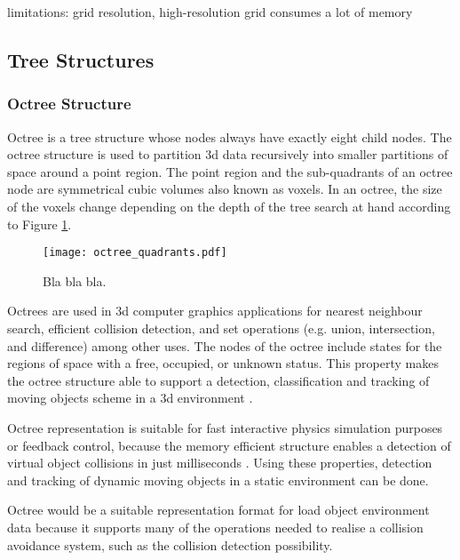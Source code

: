 \documentclass[12pt,a4paper,oneside,pdftex]{report}
\begin{document}
limitations: grid resolution, high-resolution grid consumes a lot of memory

\subsection{Tree Structures}
\label{subsection:tree_structures}

\subsubsection{Octree Structure}

Octree is a tree structure whose nodes always have exactly eight child nodes. The octree structure is used to partition 3d data recursively into smaller partitions of space around a point region. The point region and the sub-quadrants of an octree node are symmetrical cubic volumes also known as voxels. In an octree, the size of the voxels change depending on the depth of the tree search at hand according to Figure \ref{fig:octree_quadrants}.

\begin{figure}[ht]
  \begin{center}
    \texttt{[image: octree\_quadrants.pdf]}
    \caption{Bla bla bla.}
    \label{fig:octree_quadrants}
  \end{center}
\end{figure}

Octrees are used in 3d computer graphics applications for nearest neighbour search, efficient collision detection, and set operations (e.g. union, intersection, and difference) among other uses. The nodes of the octree include states for the regions of space with a free, occupied, or unknown status. This property makes the octree structure able to support a detection, classification and tracking of moving objects scheme in a 3d environment \citep{Azim12, Ouyang12}.

Octree representation is suitable for fast interactive physics simulation purposes or feedback control, because the memory efficient structure enables a detection of virtual object collisions in just milliseconds \citep{Noborio99}. Using these properties, detection and tracking of dynamic moving objects in a static environment can be done.

Octree would be a suitable representation format for load object environment data because it supports many of the operations needed to realise a collision avoidance system, such as the collision detection possibility.
\end{document}
